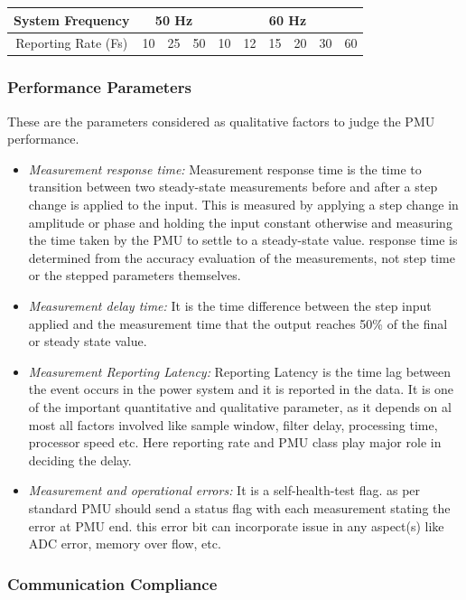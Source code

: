 \begin{table}
	\begin{center}
		\setlength\arrayrulewidth{1pt}
		\begin{tabular}{|c|c|c|c|c|c|c|c|c|c|}
			\hline
			System Frequency & \multicolumn{3}{c}{50 Hz} & \multicolumn{6}{|c|}{60 Hz}\\
			\hline 
			Reporting Rate (Fs)& 10 & 25 & 50 & 	10& 12 &15 & 20 & 30 & 60\\
			\hline
		\end{tabular}
	\end{center}
\end{table}
 

\subsubsection{Performance Parameters}
These are the parameters considered as qualitative factors to judge the PMU performance. 

\begin{itemize}
	\item  \textit{Measurement response time:} Measurement response time is the time to transition between two steady-state measurements before and
	after a step change is applied to the input. This is measured by applying a step change in amplitude or phase and holding the input constant otherwise and measuring the time taken  by the PMU to settle to a steady-state value. response time is determined from the accuracy evaluation of the measurements, not step time or the stepped	parameters themselves.
	\item \textit{Measurement delay time:} It is the time difference between the step input applied and the measurement time that the output reaches 50\% of the final or steady state value.  
	\item \textit{Measurement Reporting Latency:} Reporting Latency is the time lag between the event occurs in the power system and it is reported in the data. It is one of the important quantitative and qualitative parameter, as it depends on al most all factors involved like sample window, filter delay, processing time, processor speed etc. Here reporting rate and PMU class play major role in deciding the delay. 
	\item \textit{Measurement and operational errors:} It is a self-health-test flag. as per standard PMU should send a status flag with each measurement stating the error at PMU end. this error bit can incorporate issue in any aspect(s) like ADC error, memory over flow, etc.
\end{itemize}

\subsubsection{Communication Compliance}
